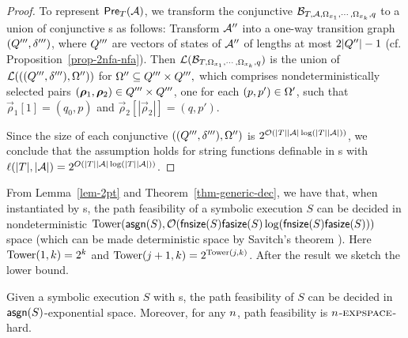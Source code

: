 \begin{proof}
To represent $\textsf{Pre}_{T}(\mathcal{A})$, we transform the conjunctive \FFA{} $\mathcal{B}_{T, \mathcal{A}, \Omega_{x_1}, \cdots, \Omega_{x_k},q}$ to a union of conjunctive \FA{}s as follows: Transform $\mathcal{A}''$ into a one-way transition graph $(Q''',\delta''')$, where $Q'''$ are vectors of states of $\mathcal{A}''$ of lengths at most $2|Q''|-1$ (cf. Proposition~\ref{prop-2nfa-nfa}). Then $\mathcal{L}(\mathcal{B}_{T, \Omega_{x_1}, \cdots, \Omega_{x_k},q})$ is the union of $\mathcal{L}(((Q''',\delta'''), \Omega''))$ for $\Omega'' \subseteq Q''' \times Q''',$ which comprises nondeterministically selected pairs $(\vec{\rho}_1, \vec{\rho}_2) \in \controls''' \times \controls'''$, one for each $(p, p') \in \Omega'$, such that $\vec{\rho}_1[1] =(q_0, p)$ and  $\vec{\rho}_2[|\vec{\rho}_2|] = (q, p')$.

Since the size of each conjunctive \FA{} $((Q''',\delta'''), \Omega'')$ is $ 2^{\mathcal{O}(|T||\mathcal{A}|\log (|T||\mathcal{A}|))}$, we conclude that 
the \prerec{} assumption holds for string functions definable in \PPT{}s with $\ell(|T|, |\mathcal{A}|) = 2^{O(|T||\mathcal{A}|\log (|T||\mathcal{A}|))}$.
\end{proof}

From Lemma~\ref{lem-2pt} and Theorem~\ref{thm-generic-dec}, %
we have that, when instantiated by \PPT{}s, %
the path feasibility of a symbolic execution $S$ can be decided in 
nondeterministic $\mathrm{Tower}(\mathsf{asgn}(S), \mathcal{O}(\mathsf{fnsize}(S) \mathsf{fasize}(S) \log(\mathsf{fnsize}(S) \mathsf{fasize}(S)))$ space (which can be made deterministic space by Savitch's theorem \cite{Savitch70}). Here $\mathrm{Tower}(1, k)= 2^k$ and $\mathrm{Tower}(j+1, k) = 2^{\mathrm{Tower}(j, k)}$. 
After the result we sketch the lower bound.
%
\begin{theorem} \label{thm:two-way}
Given a symbolic execution $S$ with \PPT{}s, the path feasibility of $S$ can be decided in $\mathsf{asgn}(S)$-exponential space. Moreover,  for any $n$, path feasibility is
 $n$-$\textsc{expspace}$-hard.
\end{theorem}


